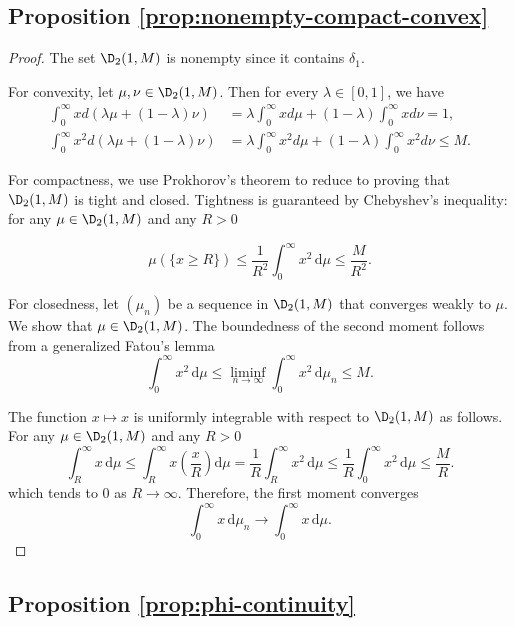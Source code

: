 \subsection{Proposition \ref{prop:nonempty-compact-convex}}
\label{subsec:proof-prop-locally-convex-space}

\begin{proof}
  The set $\D_2(1, M)$ is nonempty since it contains $\delta_1$.

  For convexity, let $\mu, \nu \in \D_2(1, M)$. Then for every $\lambda \in [0,1]$, we have
  \begin{align*}
    \int_0^\infty x d(\lambda \mu + (1-\lambda)\nu)
     & = \lambda \int_0^\infty x d\mu + (1-\lambda) \int_0^\infty x d\nu = 1,       \\
    \int_0^\infty x^2 d(\lambda \mu + (1-\lambda)\nu)
     & = \lambda \int_0^\infty x^2 d\mu + (1-\lambda) \int_0^\infty x^2 d\nu \le M.
  \end{align*}

  For compactness, we use Prokhorov's theorem to reduce to proving that $\D_2(1, M)$ is tight and closed. Tightness is guaranteed by Chebyshev's inequality: for any $\mu \in \D_2(1, M)$ and any $R > 0$

  \begin{equation}
    \mu(\{x \ge R\}) \le \dfrac{1}{R^2}\int_{0}^\infty x^2 \,\mathrm{d}\mu \le \dfrac{M}{R^2}.
  \end{equation}

  For closedness, let $(\mu_n)$ be a sequence in $\D_2(1, M)$ that converges weakly to $\mu$. We show that $\mu \in \D_2(1, M)$. The boundedness of the second moment follows from a generalized Fatou's lemma \cite[Theorem 1.1]{feinberg2014fatou}
  $$\int_0^\infty x^2 \,\mathrm{d}\mu \le \liminf_{n \to \infty} \int_0^\infty x^2 \,\mathrm{d}\mu_n \le M.$$

  The function $x\mapsto x$ is uniformly integrable with respect to $\D_2(1, M)$ as follows. For any $\mu \in \D_2(1, M)$ and any $R > 0$
  $$\int_{R}^\infty x \,\mathrm{d}\mu \le \int_{R}^\infty x \left(\frac{x}{R} \right) \mathrm{d}\mu = \frac{1}{R} \int_{R}^\infty x^2 \,\mathrm{d}\mu \le \frac{1}{R} \int_{0}^\infty x^2 \,\mathrm{d}\mu \le \frac{M}{R}.$$
  which tends to 0 as $R \to \infty$. Therefore, the first moment converges \cite[Theorem 3.5]{billingsley1999convergence}
  $$\int_0^\infty x \,\mathrm{d}\mu_n \to \int_0^\infty x \,\mathrm{d}\mu.$$
\end{proof}

\subsection{Proposition \ref{prop:phi-continuity}}
\label{subsec:proof-prop-phi-continuity}

